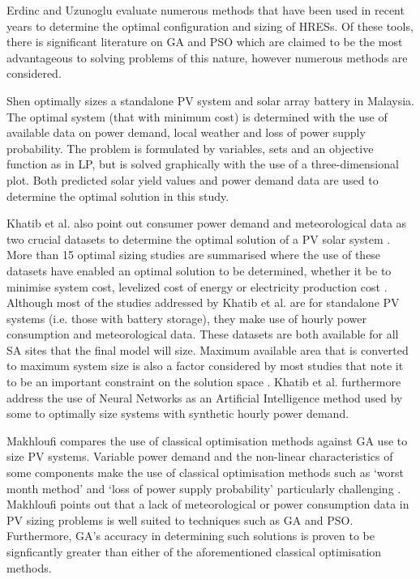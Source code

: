 \documentclass[a4paper,11pt,fleqn]{report}
\begin{document}
Erdinc and Uzunoglu \citep{erdinc2012} evaluate numerous methods that have been used in recent years to determine the optimal configuration and sizing of \ac{HRES}s. Of these tools, there is significant literature on \ac{GA} and \ac{PSO} which are claimed to be the most advantageous to solving problems of this nature, however numerous methods are considered.

Shen \citep{shen2009} optimally sizes a standalone \ac{PV} system and solar array battery in Malaysia. The optimal system (that with minimum cost) is determined with the use of available data on power demand, local weather and loss of power supply probability. The problem is formulated by variables, sets and an objective function as in \ac{LP}, but is solved graphically with the use of a three-dimensional plot. Both predicted solar yield values and power demand data are used to determine the optimal solution in this study.

Khatib et al. also point out consumer power demand and meteorological data as two crucial datasets to determine the optimal solution of a \ac{PV} solar system \citep{khatib2016}. More than 15 optimal sizing studies are summarised where the use of these datasets have enabled an optimal solution to be determined, whether it be to minimise system cost, levelized cost of energy or electricity production cost \citep{khatib2016}. Although most of the studies addressed by Khatib et al. are for standalone \ac{PV} systems (i.e. those with battery storage), they make use of hourly power consumption and meteorological data. These datasets are both available for all \ac{SA} sites that the final model will size. Maximum available area that is converted to maximum system size is also a factor considered by most studies that note it to be an important constraint on the solution space \citep{khatib2016}. Khatib et al. furthermore address the use of Neural Networks as an Artificial Intelligence method used by some to optimally size systems with synthetic hourly power demand.

Makhloufi compares the use of classical optimisation methods against \ac{GA} use to size \ac{PV} systems. Variable power demand and the non-linear characteristics of some components make the use of classical optimisation methods such as `worst month method' and `loss of power supply probability' particularly challenging \citep{makhloufi2015}. Makhloufi points out that a lack of meteorological or power consumption data in \ac{PV} sizing problems is well suited to techniques such as \ac{GA} and \ac{PSO}. Furthermore, \ac{GA}'s accuracy in determining such solutions is proven to be signficantly greater than either of the aforementioned classical optimisation methods.
\end{document}
